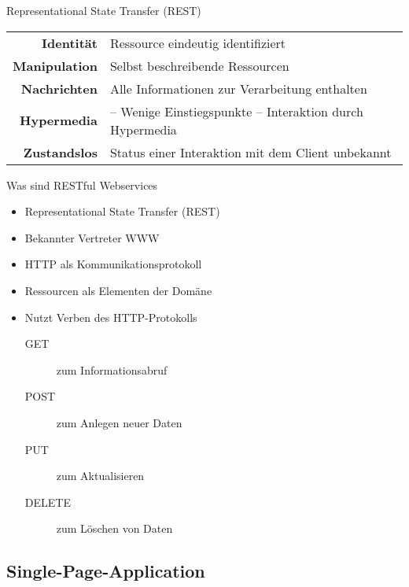 \begin{frame}{Representational State Transfer (REST)}
  \begin{tabularx}{\textwidth}{rX}
    \textbf{\color{maincolor}Identität} & Ressource eindeutig identifiziert \\
    \textbf{\color{maincolor}Manipulation} & Selbst beschreibende Ressourcen \\
    \textbf{\color{maincolor}Nachrichten} & Alle Informationen 
      zur Verarbeitung \newline
      enthalten\\
    \textbf{\color{maincolor}Hypermedia} & 
      \textcolor{maincolor}{--} Wenige Einstiegspunkte \newline
      \textcolor{maincolor}{--} Interaktion durch Hypermedia \\
    \textbf{\color{maincolor}Zustandslos} & Status einer Interaktion mit dem
      Client unbekannt \\
  \end{tabularx}
\end{frame}

\begin{frame}{Was sind RESTful Webservices}
  \begin{itemize}
    \item Representational State Transfer (REST)
    \item Bekannter Vertreter WWW
    \item HTTP als Kommunikationsprotokoll
    \item Ressourcen als Elementen der Domäne
    \item Nutzt Verben des HTTP-Protokolls
    \begin{description}
      \item[GET] zum Informationsabruf
      \item[POST] zum Anlegen neuer Daten
      \item[PUT] zum Aktualisieren 
      \item[DELETE] zum Löschen von Daten
    \end{description}
  \end{itemize}
\end{frame}

\subsection{Single-Page-Application}

